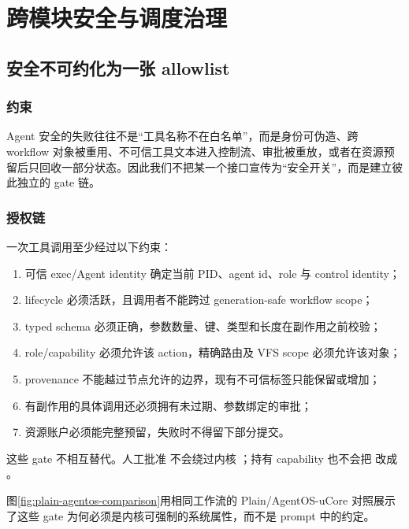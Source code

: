 \chapter{跨模块安全与调度治理}
\label{chap:security-scheduling}

\section{安全不可约化为一张 allowlist}

\subsection{约束}

Agent 安全的失败往往不是“工具名称不在白名单”，而是身份可伪造、跨 workflow 对象被重用、不可信工具文本进入控制流、审批被重放，或者在资源预留后只回收一部分状态。因此我们不把某一个接口宣传为“安全开关”，而是建立彼此独立的 gate 链。

\subsection{授权链}

一次工具调用至少经过以下约束：

\begin{enumerate}
  \item 可信 exec/Agent identity 确定当前 PID、agent id、role 与 control identity；
  \item lifecycle 必须活跃，且调用者不能跨过 generation-safe workflow scope；
  \item typed schema 必须正确，参数数量、键、类型和长度在副作用之前校验；
  \item role/capability 必须允许该 action，精确路由及 VFS scope 必须允许该对象；
  \item provenance 不能越过节点允许的边界，现有不可信标签只能保留或增加；
  \item 有副作用的具体调用还必须拥有未过期、参数绑定的审批；
  \item 资源账户必须能完整预留，失败时不得留下部分提交。
\end{enumerate}

这些 gate 不相互替代。人工批准  不会绕过内核 ；持有 capability 也不会把  改成 。

图\ref{fig:plain-agentos-comparison}用相同工作流的 Plain/AgentOS-uCore 对照展示了这些 gate 为何必须是内核可强制的系统属性，而不是 prompt 中的约定。

